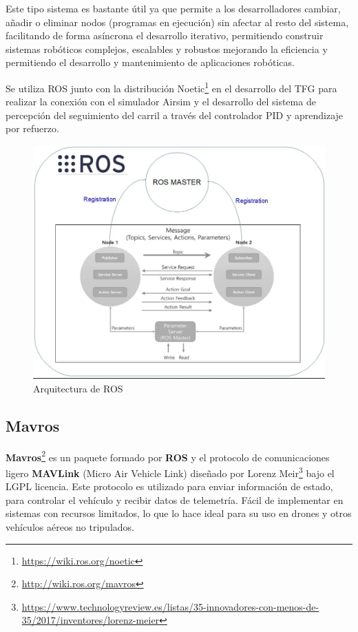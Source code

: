 Este tipo sistema es bastante útil ya que permite a los desarrolladores cambiar, añadir o eliminar nodos (programas en ejecución) sin afectar al resto del sistema, facilitando de forma asíncrona
el desarrollo iterativo, permitiendo construir sistemas robóticos complejos, escalables y robustos mejorando la eficiencia y permitiendo el desarrollo y mantenimiento de aplicaciones
robóticas. 

Se utiliza ROS junto con la distribución Noetic\footnote{\url{https://wiki.ros.org/noetic}} en el desarrollo del TFG para realizar la conexión con el simulador Airsim y el desarrollo del sistema de percepción del seguimiento del carril a través del controlador PID y 
aprendizaje por refuerzo. 


\begin{figure} [H]
    \begin{center}
      \includegraphics[scale=0.4]{figs/Plataformas_Desarollo/arq_ros.png}
    \end{center}
    \caption{Arquitectura de ROS}
    \label{fig:ArqROS}
  \end{figure}
\subsection{Mavros}
\vspace{-1.5em}
\label{sec:mavros}

\textbf{Mavros}\footnote{\url{http://wiki.ros.org/mavros}} es un paquete formado por \textbf{ROS} y el protocolo de comunicaciones ligero \textbf{MAVLink} (Micro Air Vehicle Link) diseñado por Lorenz Meir\footnote{\url{https://www.technologyreview.es/listas/35-innovadores-con-menos-de-35/2017/inventores/lorenz-meier}} bajo el LGPL licencia. Este protocolo es utilizado para enviar información de estado,
para controlar el vehículo y recibir datos de telemetría. Fácil de implementar en sistemas con recursos limitados, 
lo que lo hace ideal para su uso en drones y otros vehículos aéreos no tripulados.

